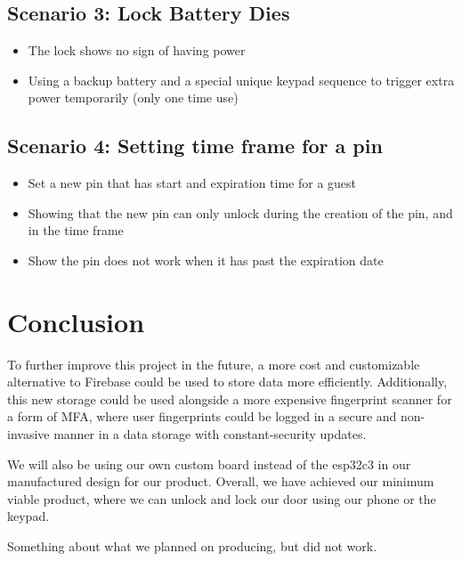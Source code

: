 \documentclass[12pt]{article}
\begin{document}
\subsection{Scenario 3: Lock Battery Dies}
\begin{itemize}
    \item The lock shows no sign of having power
    \item Using a backup battery and a special unique keypad sequence to trigger extra power temporarily (only one time use)
\end{itemize}

\subsection{Scenario 4: Setting time frame for a pin}
\begin{itemize}
    \item Set a new pin that has start and expiration time for a guest
    \item Showing that the new pin can only unlock during the creation of the pin, and in the time frame
    \item Show the pin does not work when it has past the expiration date
\end{itemize}

\section{Conclusion}
To further improve this project in the future, a more cost and customizable alternative to Firebase could be used to store data more efficiently. Additionally, this new storage could be used alongside a more expensive fingerprint scanner for a form of MFA, where user fingerprints could be logged in a secure and non-invasive manner in a data storage with constant-security updates.

We will also be using our own custom board instead of the esp32c3 in our manufactured design for our product. Overall, we have achieved our minimum viable product, where we can unlock and lock our door using our phone or the keypad.

Something about what we planned on producing, but did not work.
\end{document}
